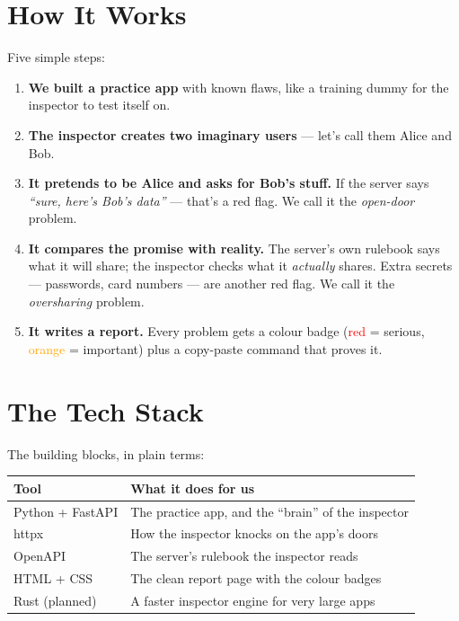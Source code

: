 \documentclass[11pt]{article}
\begin{document}
\section{How It Works}

\noindent Five simple steps:

\begin{enumerate}[leftmargin=1.8em, itemsep=2mm]
  \item \textbf{We built a practice app} with known flaws, like a training dummy
        for the inspector to test itself on.
  \item \textbf{The inspector creates two imaginary users} --- let's call them
        Alice and Bob.
  \item \textbf{It pretends to be Alice and asks for Bob's stuff.}
        If the server says \emph{``sure, here's Bob's data''} --- that's a red flag.
        We call it the \emph{open-door} problem.
  \item \textbf{It compares the promise with reality.} The server's own rulebook
        says what it will share; the inspector checks what it \emph{actually} shares.
        Extra secrets --- passwords, card numbers --- are another red flag. We call
        it the \emph{oversharing} problem.
  \item \textbf{It writes a report.} Every problem gets a colour badge
        (\textcolor{red}{red} = serious, \textcolor{orange}{orange} = important)
        plus a copy-paste command that proves it.
\end{enumerate}

\section{The Tech Stack}

\noindent The building blocks, in plain terms:

\begin{center}
\begin{tabular}{ll}
\toprule
\textbf{Tool} & \textbf{What it does for us} \\
\midrule
Python + FastAPI & The practice app, and the ``brain'' of the inspector \\
httpx & How the inspector knocks on the app's doors \\
OpenAPI & The server's rulebook the inspector reads \\
HTML + CSS & The clean report page with the colour badges \\
Rust (planned) & A faster inspector engine for very large apps \\
\bottomrule
\end{tabular}
\end{center}
\end{document}
